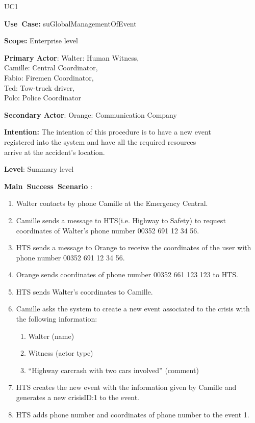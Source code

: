 \begin{lyxlist}{UC1}
\small{
\item [\textbf{Use~Case:}] suGlobalManagementOfEvent
\item [\textbf{Scope:}] Enterprise level
\item [\textbf{Primary Actor}:] Walter: Human Witness,\\ 
						        Camille: Central Coordinator,\\
								Fabio: Firemen Coordinator,\\
								Ted: Tow-truck driver,\\ 
								Polo: Police Coordinator
\item [\textbf{Secondary Actor}:] Orange: Communication Company
\item [\textbf{Intention:}] The intention of this procedure is to have a new
event\\ registered into the system and have all the required resources\\ arrive
at the accident’s location.
\item [\textbf{Level}:] Summary level
\item [\textbf{Main~Success~Scenario}]:
\begin{enumerate}
  \item Walter contacts by phone Camille at the Emergency Central.
  \item Camille sends a message to HTS(i.e. Highway to Safety) to request
  coordinates of Walter's phone number 00352 691 12 34 56.
  \item HTS sends a message to Orange to receive the coordinates of the user
  with phone number 00352 691 12 34 56.
  \item Orange sends coordinates of phone number 00352 661 123 123 to HTS.
  \item HTS sends Walter's coordinates to Camille.
  \item Camille asks the system to create a new event associated to the crisis
  with the following information:
  \begin{enumerate}
  \item Walter (name)
  \item Witness (actor type)
  \item ``Highway carcrash with two cars involved'' (comment)
  \end{enumerate}
  \item HTS creates the new event with the information given by Camille and
  generates a new crisisID:1 to the event.
  \item HTS adds phone number and coordinates of phone number to the event 1.

\end{enumerate}}
\end{lyxlist}
